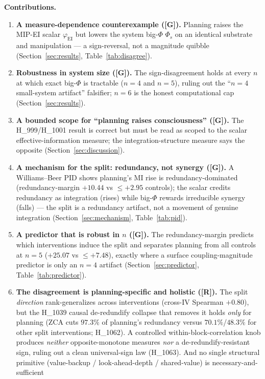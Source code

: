 \documentclass[11pt,a4paper]{article}
\providecommand{\tierGreen}{\textcolor{green!50!black}{\textbf{[G]}}}
\providecommand{\tierRed}{\textcolor{red!70!black}{\textbf{[R]}}}
\newcommand{\faithful}{\ensuremath{\varphi_{\mathrm{EI}}}}
\newcommand{\bigphi}{\ensuremath{\Phi_{s}}}
\begin{document}
\medskip
\noindent\textbf{Contributions.}
\begin{enumerate}\itemsep0.3em
\item \textbf{A measure-dependence counterexample (\tierGreen).} Planning
raises the MIP-EI scalar \faithful{} but lowers the system big-$\Phi$
\bigphi{} on an identical substrate and manipulation --- a sign-reversal, not a
magnitude quibble (Section~\ref{sec:results}, Table~\ref{tab:disagree}).
\item \textbf{Robustness in system size (\tierGreen).} The sign-disagreement
holds at every $n$ at which exact big-$\Phi$ is tractable ($n=4$ and $n=5$),
ruling out the ``$n=4$ small-system artifact'' falsifier; $n=6$ is the honest
computational cap (Section~\ref{sec:results}).
\item \textbf{A bounded scope for ``planning raises consciousness'' (\tierGreen).}
The H\_999/H\_1001 result is correct but must be read as scoped to the scalar
effective-information measure; the integration-structure measure says the
opposite (Section~\ref{sec:discussion}).
\item \textbf{A mechanism for the split: redundancy, not synergy (\tierGreen).}
A Williams--Beer PID shows planning's MI rise is redundancy-dominated
(redundancy-margin $+10.44$ vs $\le +2.95$ controls); the scalar credits
redundancy as integration (rises) while big-$\Phi$ rewards irreducible synergy
(falls) --- the split is a redundancy artifact, not a movement of genuine
integration (Section~\ref{sec:mechanism}, Table~\ref{tab:pid}).
\item \textbf{A predictor that is robust in $n$ (\tierGreen).} The
redundancy-margin predicts which interventions induce the split and separates
planning from all controls at $n=5$ ($+25.07$ vs $\le +7.48$), exactly where a
surface coupling-magnitude predictor is only an $n=4$ artifact
(Section~\ref{sec:predictor}, Table~\ref{tab:predictor}).
\item \textbf{The disagreement is planning-specific and holistic (\tierRed).}
The split \emph{direction} rank-generalizes across interventions
(cross-IV Spearman $+0.80$), but the H\_1039 causal de-redundify collapse that
removes it holds \emph{only} for planning (ZCA cuts $97.3\%$ of planning's
redundancy versus $70.1\%$/$48.3\%$ for other split interventions; H\_1062). A
controlled within-block-correlation knob produces \emph{neither}
opposite-monotone measures \emph{nor} a de-redundify-resistant sign, ruling out
a clean universal-sign law (H\_1063). And no single structural primitive
(value-backup / look-ahead-depth / shared-value) is necessary-and-sufficient

\end{enumerate}
\end{document}
